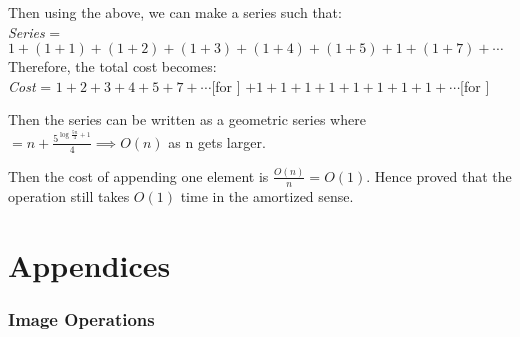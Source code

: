 \documentclass[addpoints]{exam}
\begin{document}
\begin{questions}
\begin{solution}
    Then using the above, we can make a series such that: \\ 
    \textit{Series} = $ 1 + (1 + 1) + (1 + 2) + (1 + 3) + (1 + 4) + (1 + 5) + 1 + (1 + 7) + \cdots $ \\ 
    Therefore, the total cost becomes: \\ 
    \textit{Cost} = $ 1 + 2 + 3 + 4 + 5 + 7 + \cdots $[for ] $ + 1 + 1 + 1 + 1 + 1 + 1 + 1 + 1 + \cdots $[for ]

    Then the series can be written as a geometric series where  $ = n + \displaystyle\frac{5^{\log\frac{5n}{4} + 1}}{4} \implies O(n) $ as n gets larger. 

    Then the cost of appending one element is $ \frac{O(n)}{n} = O(1) $. Hence proved that the  operation still takes $ O(1) $ time in the amortized sense.

  \end{solution}

\end{questions}

\newpage
\part{Appendices}

\appendix
\section{}


\newpage
\section{}


\newpage
\section{Image Operations}

\end{document}
